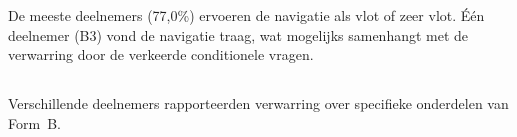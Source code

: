 De meeste deelnemers (77,0\%) ervoeren de navigatie als vlot of zeer vlot. Één deelnemer (B3) vond de navigatie traag, wat mogelijks samenhangt met de verwarring door de verkeerde conditionele vragen.

\subsection{}

\subsubsection{}

Verschillende deelnemers rapporteerden verwarring over specifieke onderdelen van Form~B.

